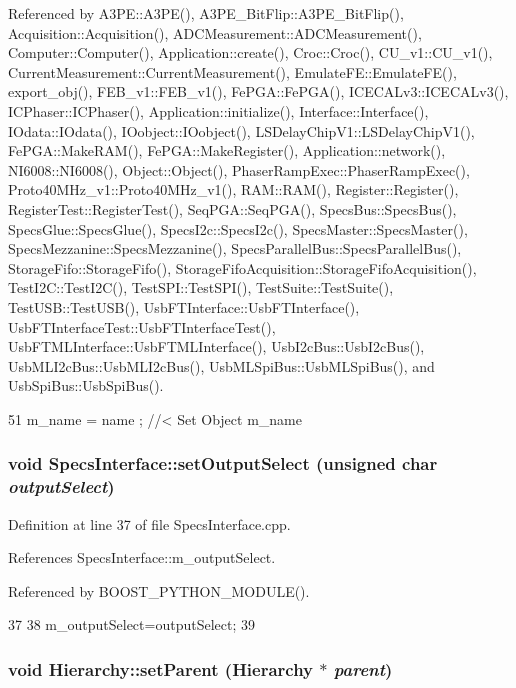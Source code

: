 Referenced by A3PE::A3PE(), A3PE\_\-BitFlip::A3PE\_\-BitFlip(), Acquisition::Acquisition(), ADCMeasurement::ADCMeasurement(), Computer::Computer(), Application::create(), Croc::Croc(), CU\_\-v1::CU\_\-v1(), CurrentMeasurement::CurrentMeasurement(), EmulateFE::EmulateFE(), export\_\-obj(), FEB\_\-v1::FEB\_\-v1(), FePGA::FePGA(), ICECALv3::ICECALv3(), ICPhaser::ICPhaser(), Application::initialize(), Interface::Interface(), IOdata::IOdata(), IOobject::IOobject(), LSDelayChipV1::LSDelayChipV1(), FePGA::MakeRAM(), FePGA::MakeRegister(), Application::network(), NI6008::NI6008(), Object::Object(), PhaserRampExec::PhaserRampExec(), Proto40MHz\_\-v1::Proto40MHz\_\-v1(), RAM::RAM(), Register::Register(), RegisterTest::RegisterTest(), SeqPGA::SeqPGA(), SpecsBus::SpecsBus(), SpecsGlue::SpecsGlue(), SpecsI2c::SpecsI2c(), SpecsMaster::SpecsMaster(), SpecsMezzanine::SpecsMezzanine(), SpecsParallelBus::SpecsParallelBus(), StorageFifo::StorageFifo(), StorageFifoAcquisition::StorageFifoAcquisition(), TestI2C::TestI2C(), TestSPI::TestSPI(), TestSuite::TestSuite(), TestUSB::TestUSB(), UsbFTInterface::UsbFTInterface(), UsbFTInterfaceTest::UsbFTInterfaceTest(), UsbFTMLInterface::UsbFTMLInterface(), UsbI2cBus::UsbI2cBus(), UsbMLI2cBus::UsbMLI2cBus(), UsbMLSpiBus::UsbMLSpiBus(), and UsbSpiBus::UsbSpiBus().


\begin{DoxyCode}
51 { m_name  = name  ; } //< Set Object m_name
\end{DoxyCode}
\hypertarget{classSpecsInterface_a1907d360f2bda367cfb1d39e379c6493}{
\subsubsection[{setOutputSelect}]{\setlength{\rightskip}{0pt plus 5cm}void SpecsInterface::setOutputSelect (unsigned char {\em outputSelect})}}
\label{classSpecsInterface_a1907d360f2bda367cfb1d39e379c6493}


Definition at line 37 of file SpecsInterface.cpp.

References SpecsInterface::m\_\-outputSelect.

Referenced by BOOST\_\-PYTHON\_\-MODULE().


\begin{DoxyCode}
37                                                               {
38     m_outputSelect=outputSelect;
39 }
\end{DoxyCode}
\hypertarget{classHierarchy_a585ad1aeec16077a0e532ab8b4fc557b}{
\subsubsection[{setParent}]{\setlength{\rightskip}{0pt plus 5cm}void Hierarchy::setParent ({\bf Hierarchy} $\ast$ {\em parent})}}
\label{classHierarchy_a585ad1aeec16077a0e532ab8b4fc557b}


